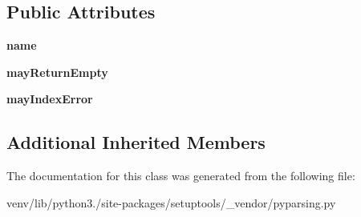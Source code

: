\subsection*{Public Attributes}
\begin{DoxyCompactItemize}
\item 
\mbox{\label{classsetuptools_1_1__vendor_1_1pyparsing_1_1___position_token_a7ed25157839d4f041dd84a5589363e82}} 
{\bfseries name}
\item 
\mbox{\label{classsetuptools_1_1__vendor_1_1pyparsing_1_1___position_token_af2bfeadf9de030ff72baeb597c07a83e}} 
{\bfseries may\+Return\+Empty}
\item 
\mbox{\label{classsetuptools_1_1__vendor_1_1pyparsing_1_1___position_token_aa27473a4eb2ec9033277ee6c3d69c8b9}} 
{\bfseries may\+Index\+Error}
\end{DoxyCompactItemize}
\subsection*{Additional Inherited Members}


The documentation for this class was generated from the following file\+:\begin{DoxyCompactItemize}
\item 
venv/lib/python3./site-\/packages/setuptools/\+\_\+vendor/pyparsing.\+py\end{DoxyCompactItemize}
